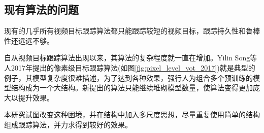 \subsection{现有算法的问题} \label{section:vot_problems}
现有的几乎所有视频目标跟踪算法都只能跟踪较短的视频目标，跟踪持久性和鲁棒性还远远不够。
\par
自从视频目标跟踪算法出现以来，其算法的复杂程度就一直在增加。Yilin Song等人2017年提出的像素级目标跟踪算法(如图\ref{fig:pixel_level_vot_2017})就是典型的例子，其模型复杂度很难描述，为了达到各种效果，强行人为组合多个预训练的模型结构成为一个大结构。新提出的算法只能继续堆砌模型数量，使算法变得更加庞大以提升效果。
\par
本研究试图改变这种困境，并在结构中加入多尺度思想，尽量重复使用简单的结构组成跟踪算法，并力求得到较好的效果。
